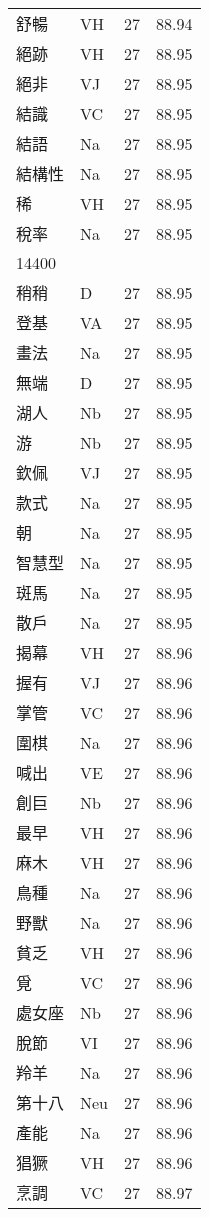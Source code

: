 \documentclass[twocolumn]{book}
\begin{document}
\begin{supertabular}{llrr}
舒暢 & VH & 27 &  88.94\\
絕跡 & VH & 27 &  88.95\\
絕非 & VJ & 27 &  88.95\\
結識 & VC & 27 &  88.95\\
結語 & Na & 27 &  88.95\\
結構性 & Na & 27 &  88.95\\
稀 & VH & 27 &  88.95\\
稅率 & Na & 27 &  88.95\\
14400\\
稍稍 & D & 27 &  88.95\\
登基 & VA & 27 &  88.95\\
畫法 & Na & 27 &  88.95\\
無端 & D & 27 &  88.95\\
湖人 & Nb & 27 &  88.95\\
游 & Nb & 27 &  88.95\\
欽佩 & VJ & 27 &  88.95\\
款式 & Na & 27 &  88.95\\
朝 & Na & 27 &  88.95\\
智慧型 & Na & 27 &  88.95\\
斑馬 & Na & 27 &  88.95\\
散戶 & Na & 27 &  88.95\\
揭幕 & VH & 27 &  88.96\\
握有 & VJ & 27 &  88.96\\
掌管 & VC & 27 &  88.96\\
圍棋 & Na & 27 &  88.96\\
喊出 & VE & 27 &  88.96\\
創巨 & Nb & 27 &  88.96\\
最早 & VH & 27 &  88.96\\
麻木 & VH & 27 &  88.96\\
鳥種 & Na & 27 &  88.96\\
野獸 & Na & 27 &  88.96\\
貧乏 & VH & 27 &  88.96\\
覓 & VC & 27 &  88.96\\
處女座 & Nb & 27 &  88.96\\
脫節 & VI & 27 &  88.96\\
羚羊 & Na & 27 &  88.96\\
第十八 & Neu & 27 &  88.96\\
產能 & Na & 27 &  88.96\\
猖獗 & VH & 27 &  88.96\\
烹調 & VC & 27 &  88.97\\

\end{supertabular}
\end{document}
